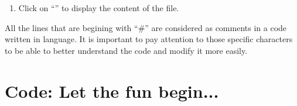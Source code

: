 \documentclass[11pt]{article}
\begin{document}
    \begin{enumerate}
        \item Click on ``\textbf{}'' to display the content of the \R file.
        \end{enumerate}

            All the lines that are begining with ``\#'' are considered as comments in a code written in \R language. It is important to pay attention to those specific characters to be able to better understand the code and modify it more easily.
        
\section{\R Code: Let the fun begin...} %
\end{document}
